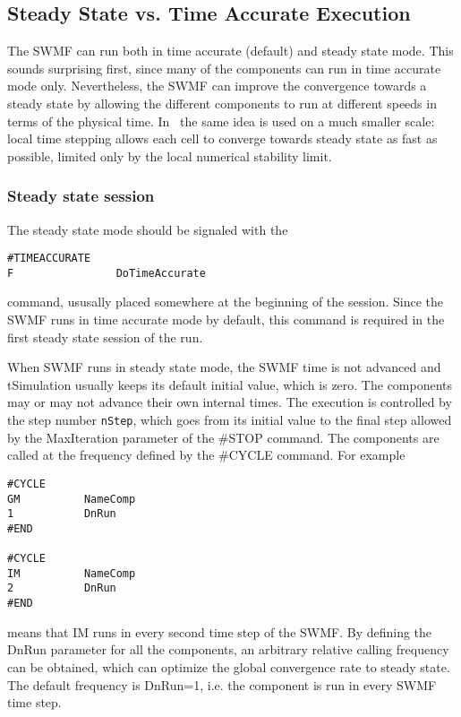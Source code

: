 \subsection{Steady State vs. Time Accurate Execution}

The SWMF can run both in time accurate (default) and
steady state mode. This sounds surprising first, 
since many of the components can run in time accurate 
mode only. Nevertheless, the SWMF can improve the convergence
towards a steady state by allowing the different components
to run at different speeds in terms of the physical time.
In \BATSRUS\ the same idea is used on a much smaller scale:
local time stepping allows each cell to converge towards
steady state as fast as possible, limited only by the local
numerical stability limit.

\subsubsection{Steady state session}

The steady state mode should be signaled with the 
\begin{verbatim}
#TIMEACCURATE
F                DoTimeAccurate
\end{verbatim}
command, ususally placed somewhere at the beginning of the session.
Since the SWMF runs in time accurate mode by default,
this command is required in the first steady state session of the run.

When SWMF runs in steady state mode, the SWMF time is not
advanced and tSimulation usually keeps its default initial value,
which is zero. 
The components may or may not advance their own
internal times. The execution is controlled by the 
step number {\tt nStep}, which goes from its initial value 
to the final step allowed by the MaxIteration parameter
of the \#STOP command. The components are called at
the frequency defined by the \#CYCLE command. For example
\begin{verbatim}
#CYCLE
GM          NameComp
1           DnRun
#END

#CYCLE
IM          NameComp
2           DnRun
#END
\end{verbatim}
means that IM runs in every second time step of the SWMF.
By defining the DnRun parameter for all the components,
an arbitrary relative calling frequency can be obtained,
which can optimize the global convergence rate to steady state.
The default frequency is DnRun=1, i.e. the component is
run in every SWMF time step. 

